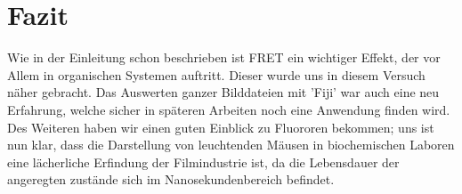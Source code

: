 

\chapter{Fazit}
\label{chap:fazit}
Wie in der Einleitung schon beschrieben ist FRET ein wichtiger Effekt, der vor Allem in organischen Systemen auftritt. Dieser 
wurde uns in diesem Versuch näher gebracht. Das Auswerten ganzer Bilddateien mit 'Fiji' war auch eine neu Erfahrung, 
welche sicher in späteren Arbeiten noch eine Anwendung finden wird. Des Weiteren haben wir einen guten Einblick zu Fluororen bekommen; uns ist nun klar, dass
die Darstellung von leuchtenden Mäusen in biochemischen Laboren eine lächerliche Erfindung der Filmindustrie ist, da die Lebensdauer der angeregten 
zustände sich im Nanosekundenbereich befindet. 

